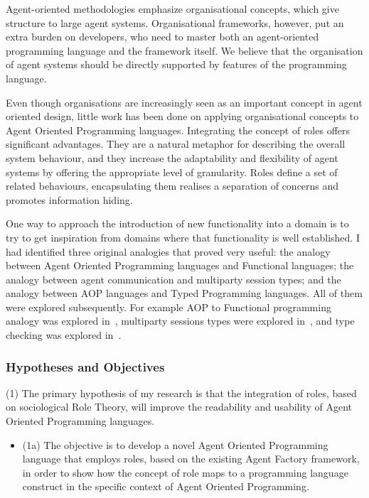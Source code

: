 \documentclass[a4paper,12pt,oneside,fleqn]{book} %
\begin{document}
Agent-oriented methodologies emphasize organisational concepts, which give
structure to large agent systems. Organisational frameworks, however, put
an extra burden on developers, who need to master both an agent-oriented
programming language and the framework itself. We believe that the
organisation of agent systems should be directly supported by features of
the programming language.

Even though organisations are increasingly seen as an important concept in
agent oriented design, little work has been done on applying organisational
concepts to Agent Oriented Programming languages. Integrating the concept
of roles offers significant advantages. They are a natural metaphor for
describing the overall system behaviour, and they increase the adaptability
and flexibility of agent systems by offering the appropriate level of
granularity. Roles define a set of related behaviours, encapsulating them
realises a separation of concerns and promotes information hiding.

One way to approach the introduction of new functionality into a domain is
to try to get inspiration from domains where that functionality is well
established. I had identified three original analogies that proved very
useful: the analogy between Agent Oriented Programming languages and
Functional languages; the analogy between agent communication and
multiparty session types; and the analogy between AOP languages and Typed
Programming languages. All of them were explored subsequently. For example
AOP to Functional programming analogy was explored
in~\cite{DBLP:conf/dalt/SolimandoT12}, multiparty sessions types were
explored in~\cite{DBLP:conf/dalt/AnconaDM12}, and type checking was
explored in~\cite{DBLP:conf/promas/RicciS12}.

\subsubsection{Hypotheses and Objectives}
(1) The primary hypothesis of my research is that the integration of roles,
based on sociological Role Theory, will improve the readability and
usability of Agent Oriented Programming languages. 
\begin{itemize}

  \item (1a) The objective is to develop a novel Agent Oriented Programming
    language that employs roles, based on the existing Agent Factory
    framework, in order to show how the concept of role maps to a
    programming language construct in the specific context of Agent
    Oriented Programming.

\end{itemize}
\end{document}
